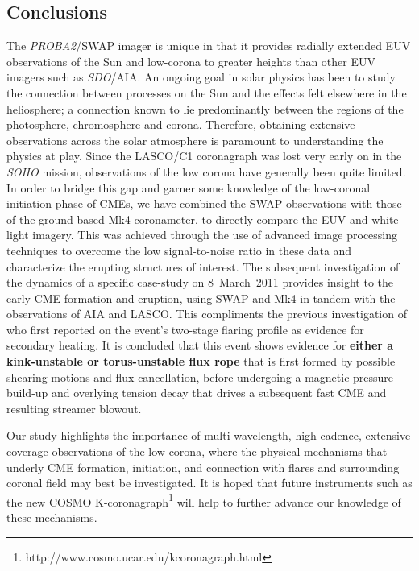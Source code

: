 \documentclass[namedreferences]{solarphysics}
\begin{document}
\begin{article}
\section{Conclusions}
\label{sect:conclusions}

The \emph{PROBA2}/SWAP imager is unique in that it provides radially extended EUV observations of the Sun and low-corona to greater heights than other EUV imagers such as \emph{SDO}/AIA. An ongoing goal in solar physics has been to study the connection between processes on the Sun and the effects felt elsewhere in the heliosphere; a connection known to lie predominantly between the regions of the photosphere, chromosphere and corona. Therefore, obtaining extensive observations across the solar atmosphere is paramount to understanding the physics at play. Since the LASCO/C1 coronagraph was lost very early on in the \emph{SOHO} mission, observations of the low corona have generally been quite limited. In order to bridge this gap and garner some knowledge of the low-coronal initiation phase of CMEs, we have combined the SWAP observations with those of the ground-based Mk4 coronameter, to directly compare the EUV and white-light imagery. This was achieved through the use of advanced image processing techniques to overcome the low signal-to-noise ratio in these data and characterize the erupting structures of interest. The subsequent investigation of the dynamics of a specific case-study on 8~March~2011 provides insight to the early CME formation and eruption, using SWAP and Mk4 in tandem with the observations of AIA and LASCO. This compliments the previous investigation of  who first reported on the event's two-stage flaring profile as evidence for secondary heating. It is concluded that this event shows evidence for {\bf either a kink-unstable or torus-unstable flux rope} that is first formed by possible shearing motions and flux cancellation, before undergoing a magnetic pressure build-up and overlying tension decay that drives a subsequent fast CME and resulting streamer blowout. 

Our study highlights the importance of multi-wavelength, high-cadence, extensive coverage observations of the low-corona, where the physical mechanisms that underly CME formation, initiation, and connection with flares and surrounding coronal field may best be investigated. It is hoped that future instruments such as the new COSMO K-coronagraph\footnote{http://www.cosmo.ucar.edu/kcoronagraph.html} will help to further advance our knowledge of these mechanisms.



\end{article}
\end{document}
